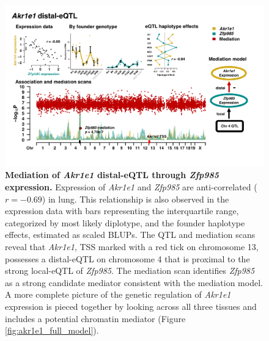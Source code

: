 \documentclass[9pt,twocolumn,twoside]{gsajnl}
\begin{document}
\begin{figure}[hp]
\renewcommand{\familydefault}{\sfdefault}\normalfont
\centering
\includegraphics[width=\textwidth, trim={0in 0.5in 0in 0in}, clip]{figs/akr1e1_mediation.png}
\caption{\textbf{Mediation of \textit{Akr1e1} distal-eQTL through \textit{Zfp985} expression.} 
Expression of \textit{Akr1e1} and \textit{Zfp985} are anti-correlated ($r = -0.69$) in lung. This relationship is also observed in the expression data with bars representing the interquartile range, categorized by most likely diplotype, and the founder haplotype effects, estimated as scaled BLUPs. The QTL and mediation scans reveal that \textit{Akr1e1}, TSS marked with a red tick on chromosome 13, possesses a distal-eQTL on chromosome 4 that is proximal to the strong local-eQTL of \textit{Zfp985}. The mediation scan identifies \textit{Zfp985} as a strong candidate mediator consistent with the mediation model. A more complete picture of the genetic regulation of \textit{Akr1e1} expression is pieced together by looking across all three tissues and includes a potential chromatin mediator (Figure \ref{fig:akr1e1_full_model}).
\label{fig:akr1e1_exmediation}}
\end{figure}

\clearpage
\end{document}
